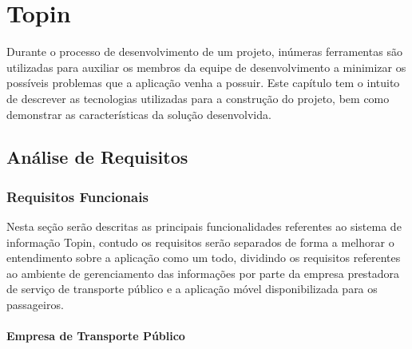 \chapter{Topin}

Durante o processo de desenvolvimento de um projeto, inúmeras ferramentas são utilizadas para auxiliar os membros da equipe de desenvolvimento a minimizar os possíveis problemas que a aplicação venha a possuir. Este capítulo tem o intuito de descrever as tecnologias utilizadas para a construção do projeto, bem como demonstrar as características da solução desenvolvida.

\section{Análise de Requisitos}

\subsection{Requisitos Funcionais}

Nesta seção serão descritas as principais funcionalidades referentes ao sistema de informação Topin, contudo os requisitos serão separados de forma a melhorar o entendimento sobre a aplicação como um todo, dividindo os requisitos referentes ao ambiente de gerenciamento das informações por parte da empresa prestadora de serviço de transporte público e a aplicação móvel disponibilizada para os passageiros.

\subsubsection*{Empresa de Transporte Público}

